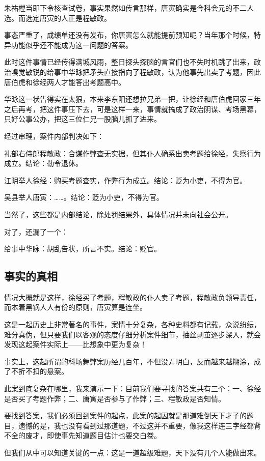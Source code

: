 \begin{multicols}{\theparacolNo}
		朱祐樘当即下令核查试卷，事实果然如传言那样，唐寅确实是今科会元的不二人选。而选定唐寅的人正是程敏政。

		事态严重了，成绩单还没有发布，你唐寅怎么就能提前预知呢？当年那个时候，特异功能似乎还不能成为这一问题的答案。

		此时这件事情已经传得满城风雨，整日探头探脑的言官们也不失时机跳了出来，政治嗅觉敏锐的给事中华眿把矛头直接指向了程敏政，认为他事先出卖了考题，因此唐伯虎和徐经两人才能答出考题高中。

		华眿这一状告得实在太狠，本来李东阳还想拉兄弟一把，让徐经和唐伯虎回家三年之后再考，把这件事压下去，可是这样一来，事情就搞成了政治阴谋、考场黑幕，只好公事公办，把这三位仁兄一股脑儿抓了进来。

		经过审理，案件内部判决如下：

		礼部右侍郎程敏政：合谋作弊查无实据，但其仆人确系出卖考题给徐经，失察行为成立。结论：勒令退休。

		江阴举人徐经：购买考题查实，作弊行为成立。结论：贬为小吏，不得为官。

		吴县举人唐寅：……。结论：贬为小吏，不得为官。

		当然了，这些都是内部结论，除处罚结果外，具体情况并未向社会公开。

		对了，还漏了一个：

		给事中华眿：胡乱告状，所言不实。结论：贬官。

		\subsection{事实的真相}
		情况大概就是这样，徐经买了考题，程敏政的仆人卖了考题，程敏政负领导责任，而本着黑锅人人有份的原则，唐寅算是连坐。

		这是一起历史上非常著名的事件，案情十分复杂，各种史料都有记载，众说纷纭，难分真伪，但只要我们以客观的态度仔细分析案件细节，抽丝剥茧逐步深入，就会发现这起案件实际上——比想象中更为复杂！

		事实上，这起所谓的科场舞弊案历经几百年，不但没弄明白，反而越来越糊涂，成了不折不扣的悬案。

		此案到底复杂在哪里，我来演示一下：目前我们要寻找的答案共有三个：一、徐经是否买了考题作弊；二、唐寅是否参与了作弊；三、程敏政是否知情。

		要找到答案，我们必须回到案件的起点，此案的起因就是那道难倒天下才子的题目，遗憾的是，我也没有看到过那道题，不过这并不重要，像我这样连三字经都背不全的废才，即使事先知道题目估计也要交白卷。

		但我们从中可以知道关键的一点：这是一道超级难题，天下没有几个人能做出来。


\end{multicols}
